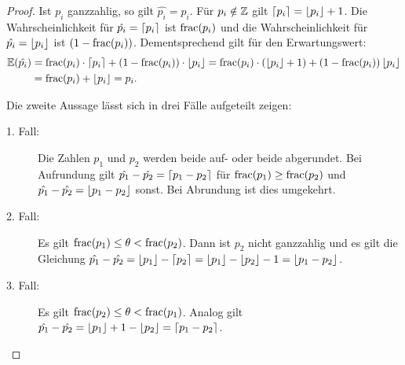 \begin{proof}
	Ist $p_i$ ganzzahlig, so gilt $\hat{p_i} = p_i$.
	Für $p_i\notin\mathbb{Z}$ gilt $\left\lceil p_i \right\rceil = \left\lfloor p_i \right\rfloor + 1$.
	Die Wahrscheinlichkeit für $\hat{p_i} = \left\lceil p_i \right\rceil$ ist $\operatorname{frac}(p_i)$ und die Wahrscheinlichkeit für $\hat{p_i} = \left\lfloor p_i \right\rfloor$ ist $(1-\operatorname{frac}(p_i))$.
	Dementsprechend gilt für den Erwartungswert: \begin{align*}
	\mathbb{E}(\hat{p_i})
	&= \operatorname{frac}(p_i) \cdot \left\lceil p_i \right\rceil + (1-\operatorname{frac}(p_i))\cdot \left\lfloor p_i \right\rfloor
	= \operatorname{frac}(p_i)\cdot (\left\lfloor p_i \right\rfloor + 1) + (1-\operatorname{frac}(p_i)) \left\lfloor p_i \right\rfloor \\
	&= \operatorname{frac}(p_i) + \left\lfloor p_i \right\rfloor = p_i.
	\end{align*}
	
	Die zweite Aussage lässt sich in drei Fälle aufgeteilt zeigen:
	\begin{description}
		\item[1. Fall:] Die Zahlen $p_1$ und $p_2$ werden beide auf- oder beide abgerundet.
		Bei Aufrundung gilt $\hat{p_1} - \hat{p_2} = \left\lceil p_1 - p_2 \right\rceil$ für $\operatorname{frac}(p_1) \geq \operatorname{frac}(p_2)$ und $\hat{p_1} - \hat{p_2} = \left\lfloor p_1 - p_2 \right\rfloor$ sonst.
		Bei Abrundung ist dies umgekehrt.
		\item[2. Fall:] Es gilt $\operatorname{frac}(p_1) \leq \theta < \operatorname{frac}(p_2)$.
		Dann ist $p_2$ nicht ganzzahlig und es gilt die Gleichung $\hat{p_1} - \hat{p_2} = \left\lfloor p_1 \right\rfloor - \left\lceil p_2 \right\rceil = \left\lfloor p_1 \right\rfloor - \left\lfloor p_2 \right\rfloor - 1 = \left\lfloor p_1 - p_2 \right\rfloor$.
		\item[3. Fall:] Es gilt $\operatorname{frac}(p_2) \leq \theta < \operatorname{frac}(p_1)$. Analog gilt $\hat{p_1} - \hat{p_2} = \left\lfloor p_1 \right\rfloor + 1 - \left\lfloor p_2 \right\rfloor = \left\lceil p_1 - p_2 \right\rceil$.
	\end{description}
	\vspace{-0.5em}
\end{proof}
